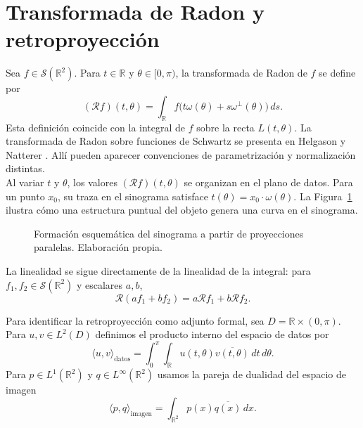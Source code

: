 \section{Transformada de Radon y retroproyección}
\label{RadonBackprojection}

Sea $f\in\mathcal S(\mathbb R^2)$. Para $t\in\mathbb R$ y $\theta\in[0,\pi)$, la transformada de Radon de $f$ se define por
\[
(\mathcal Rf)(t,\theta)
=
\int_{\mathbb R}
f\bigl(t\omega(\theta)+s\omega^\perp(\theta)\bigr)\,ds.
\]
Esta definición coincide con la integral de $f$ sobre la recta $L(t,\theta)$. La transformada de Radon sobre funciones de Schwartz se presenta en Helgason \cite{helgason1999} y Natterer \cite[Sec.~II.1, pp.~9--10]{natterer2001}. Allí pueden aparecer convenciones de parametrización y normalización distintas.\\

Al variar $t$ y $\theta$, los valores $(\mathcal Rf)(t,\theta)$ se organizan en el plano de datos. Para un punto $x_0$, su traza en el sinograma satisface $t(\theta)=x_0\cdot\omega(\theta)$. La Figura~\ref{fig:sinograma-diagrama} ilustra cómo una estructura puntual del objeto genera una curva en el sinograma.

\begin{figure}[htbp]
\centering
\resizebox{0.88\textwidth}{!}{}
\caption{Formación esquemática del sinograma a partir de proyecciones paralelas. Elaboración propia.}
\label{fig:sinograma-diagrama}
\end{figure}

La linealidad se sigue directamente de la linealidad de la integral: para $f_1,f_2\in\mathcal S(\mathbb R^2)$ y escalares $a,b$,
\[
\mathcal R(af_1+bf_2)=a\mathcal Rf_1+b\mathcal Rf_2.
\]

Para identificar la retroproyección como adjunto formal, sea $D=\mathbb R\times(0,\pi)$. Para $u,v\in L^2(D)$ definimos el producto interno del espacio de datos por
\[
\langle u,v\rangle_{\mathrm{datos}}
=
\int_0^\pi\int_{\mathbb R}
u(t,\theta)\overline{v(t,\theta)}\,dt\,d\theta.
\]
Para $p\in L^1(\mathbb R^2)$ y $q\in L^\infty(\mathbb R^2)$ usamos la pareja de dualidad del espacio de imagen
\[
\langle p,q\rangle_{\mathrm{imagen}}
=
\int_{\mathbb R^2}p(x)\overline{q(x)}\,dx.
\]

